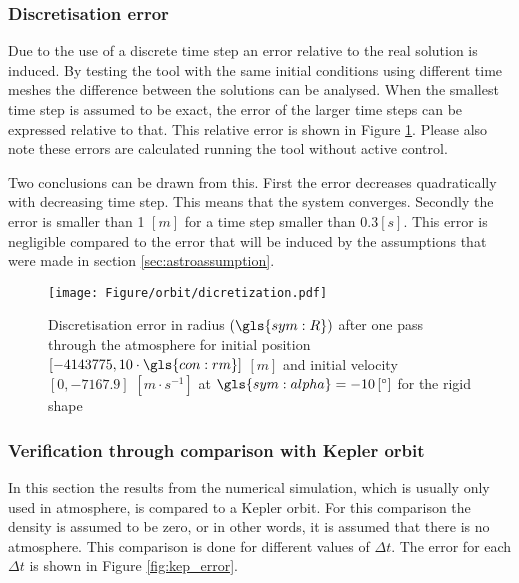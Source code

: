 \subsubsection{Discretisation error}
\label{sec:astrodisc}

Due to the use of a discrete time step an error relative to the real solution is induced. By testing the tool with the same initial conditions using different time meshes the difference between the solutions can be analysed. When the smallest time step is assumed to be exact, the error of the larger time steps can be expressed relative to that. This relative error is shown in Figure \ref{fig:atmos_disc}. Please also note these errors are calculated running the tool without active control.

Two conclusions can be drawn from this. First the error decreases quadratically with decreasing time step. This means that the system converges. Secondly the error is smaller than 1 $\left[m\right]$ for a time step smaller than $0.3 \left[s\right]$. This error is negligible compared to the error that will be induced by the assumptions that were made in section \ref{sec:astroassumption}.



\begin{figure}[ht]
	\centering
	\texttt{[image: Figure/orbit/dicretization.pdf]}
	\caption[Discretisation error in radius $\left(\gls{sym:R}\right)$ after one pass through the atmosphere for the rigid shape]{Discretisation error in radius $\left(\gls{sym:R}\right)$ after one pass through the atmosphere for initial position $\left[-4143775,10\cdot\gls{con:rm}\right]$ $\left[m\right]$ and initial velocity $\left[0,-7167.9\right]$ $\left[m\cdot s^{-1} \right]$ at $\gls{sym:alpha}=-10\left[^\circ\right]$ for the rigid shape}
	\label{fig:atmos_disc}
\end{figure}

\subsubsection{Verification through comparison with Kepler orbit}
\label{sec:astroverf}

In this section the results from the numerical simulation, which is usually only used in atmosphere, is compared to a Kepler orbit. For this comparison the density is assumed to be zero, or in other words, it is assumed that there is no atmosphere. This comparison is done for different values of $\Delta t$. The error for each $\Delta t$ is shown in Figure \ref{fig:kep_error}.

